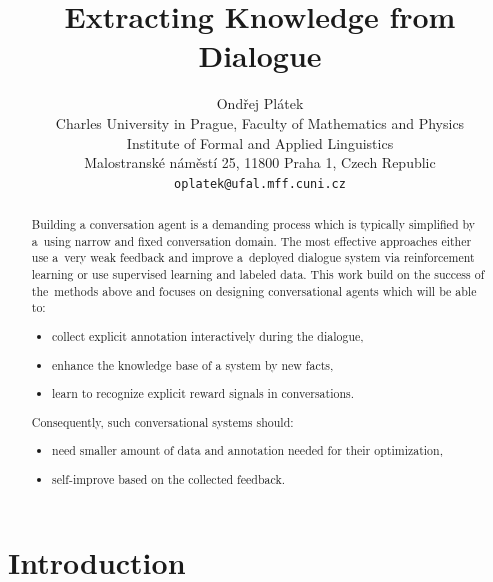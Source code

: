 \documentclass[11pt]{article}
\title{Extracting Knowledge from Dialogue}
\author{Ondřej Plátek \\
  Charles University in Prague, Faculty of Mathematics and Physics \\
  Institute of Formal and Applied Linguistics \\
  Malostranské náměstí 25, 11800 Praha 1, Czech Republic\\
  {\tt oplatek@ufal.mff.cuni.cz}\\}
\date{}
\begin{document}
\maketitle
\begin{abstract}
Building a conversation agent is a demanding process which is typically simplified by a~using narrow and fixed conversation domain.
The most effective approaches either use a~very weak feedback and improve a~deployed dialogue system via reinforcement learning or use supervised learning and labeled data.
This work build on the success of the~methods above and focuses on designing conversational agents which will be able to:
\begin{itemize}
    \item collect explicit annotation interactively during the dialogue,
    \item enhance the knowledge base of a system by new facts,
    \item learn to recognize explicit reward signals in conversations.
\end{itemize}
Consequently, such conversational systems should:
\begin{itemize}
    \item need smaller amount of data and annotation needed for their optimization,
    \item self-improve based on the collected feedback.
\end{itemize}
\end{abstract}

\section{Introduction}
\label{sec:introduction}
\end{document}
